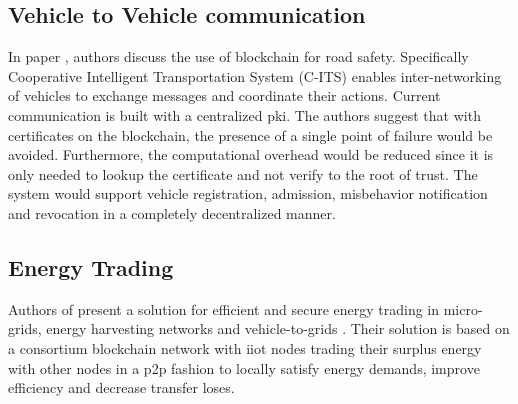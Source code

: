 \subsection{Vehicle to Vehicle communication}
In paper \cite{lasla2018efficient}, authors discuss the use of blockchain for road safety. Specifically Cooperative Intelligent Transportation System (C-ITS) enables inter-networking of vehicles to exchange messages and coordinate their actions. Current communication is built with a centralized \acrshort{pki}. The authors suggest that with certificates on the blockchain, the presence of a single point of failure would be avoided. Furthermore, the computational overhead would be reduced since it is only needed to lookup the certificate and not verify to the root of trust. The system would support vehicle registration, admission, misbehavior notification and revocation in a completely decentralized manner.
 
\subsection{Energy Trading}
Authors of \cite{li2018consortium} present a solution for efficient and secure energy trading in micro-grids, energy harvesting networks and vehicle-to-grids \cite{kang2017enabling}. Their solution is based on a consortium blockchain network with \acrshort{iiot} nodes trading their surplus energy with other nodes in a \acrshort{p2p} fashion to locally satisfy energy demands, improve efficiency and decrease transfer loses. 